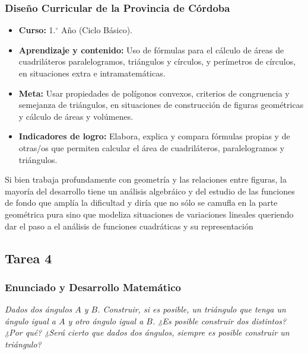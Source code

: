 \documentclass[11pt,a4paper]{article}
\begin{document}
\subsubsection{Diseño Curricular de la Provincia de Córdoba}
\begin{itemize}
    \item \textbf{Curso:} 1.$^{\circ}$ Año (Ciclo Básico).
    \item \textbf{Aprendizaje y contenido:} Uso de fórmulas para el cálculo de áreas de cuadriláteros paralelogramos, triángulos y círculos, y perímetros de círculos, en situaciones extra e intramatemáticas.
    \item \textbf{Meta:} Usar propiedades de polígonos convexos, criterios de congruencia y semejanza de triángulos, en situaciones de construcción de figuras geométricas y cálculo de áreas y volúmenes.
    \item \textbf{Indicadores de logro:} Elabora, explica y compara fórmulas propias y de otras/os que permiten calcular el área de cuadriláteros, paralelogramos y triángulos.
\end{itemize}
    Si bien trabaja profundamente con geometría y las relaciones entre figuras, la mayoría del desarrollo tiene un análisis algebráico y del estudio de las funciones de fondo que amplía la dificultad y diría que no sólo se camufla en la parte geométrica pura sino que modeliza situaciones de variaciones lineales queriendo dar el paso a el análisis de funciones cuadráticas y su representación
\subsection{Tarea 4}

\subsubsection{Enunciado y Desarrollo Matemático}
\textit{Dados dos ángulos $A$ y $B$. Construir, si es posible, un triángulo que tenga un ángulo igual a $A$ y otro ángulo igual a $B$. ¿Es posible construir dos distintos? ¿Por qué? ¿Será cierto que dados dos ángulos, siempre es posible construir un triángulo?}
\end{document}
